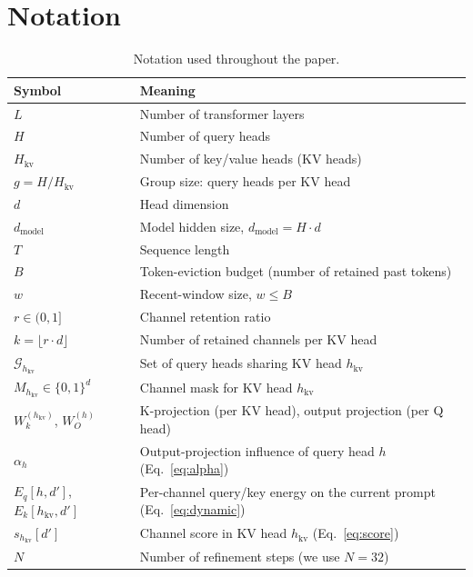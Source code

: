 \documentclass{article}
\begin{document}


 
 
% 
 
 
 
\newpage
\appendix
 
\section{Notation}
\label{app:notation}
 
\begin{table}[h]
\centering
\small
\setlength{\tabcolsep}{6pt}
\renewcommand{\arraystretch}{1.15}
\caption{Notation used throughout the paper.}
\label{tab:notation}
\begin{tabular}{@{}ll@{}}
\toprule
\textbf{Symbol} & \textbf{Meaning} \\
\midrule
$L$ & Number of transformer layers \\
$H$ & Number of query heads \\
$H_{\mathrm{kv}}$ & Number of key/value heads (KV heads) \\
$g = H / H_{\mathrm{kv}}$ & Group size: query heads per KV head \\
$d$ & Head dimension \\
$d_{\mathrm{model}}$ & Model hidden size, $d_{\mathrm{model}} = H \cdot d$ \\
$T$ & Sequence length \\
$B$ & Token-eviction budget (number of retained past tokens) \\
$w$ & Recent-window size, $w \le B$ \\
$r \in (0, 1]$ & Channel retention ratio \\
$k = \lfloor r \cdot d \rfloor$ & Number of retained channels per KV head \\
$\mathcal{G}_{h_{\mathrm{kv}}}$ & Set of query heads sharing KV head $h_{\mathrm{kv}}$ \\
$M_{h_{\mathrm{kv}}} \in \{0,1\}^d$ & Channel mask for KV head $h_{\mathrm{kv}}$ \\
$W_k^{(h_{\mathrm{kv}})}$, $W_O^{(h)}$ & K-projection (per KV head), output projection (per Q head) \\
$\alpha_h$ & Output-projection influence of query head $h$ (Eq.~\ref{eq:alpha}) \\
$E_q[h, d']$, $E_k[h_{\mathrm{kv}}, d']$ & Per-channel query/key energy on the current prompt (Eq.~\ref{eq:dynamic}) \\
$s_{h_{\mathrm{kv}}}[d']$ & Channel score in KV head $h_{\mathrm{kv}}$ (Eq.~\ref{eq:score}) \\
$N$ & Number of refinement steps (we use $N{=}32$) \\
\bottomrule
\end{tabular}
\end{table}
 
\end{document}
